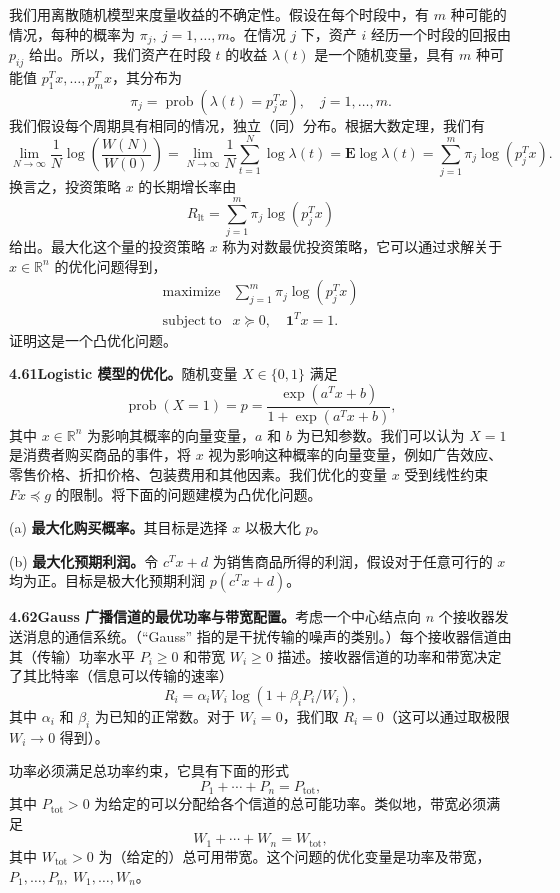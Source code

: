 \documentclass[UTF8,12pt,a4paper,fontset=fandol]{ctexart}
\begin{document}
我们用离散随机模型来度量收益的不确定性。假设在每个时段中，有 $m$ 种可能的情况，每种的概率为 $\pi_j,\ j=1,\ldots,m$。在情况 $j$ 下，资产 $i$ 经历一个时段的回报由 $p_{ij}$ 给出。所以，我们资产在时段 $t$ 的收益 $\lambda(t)$ 是一个随机变量，具有 $m$ 种可能值 $p_1^Tx,\ldots,p_m^Tx$，其分布为
\[
\pi_j=\operatorname{prob}(\lambda(t)=p_j^Tx),\quad j=1,\ldots,m.
\]
我们假设每个周期具有相同的情况，独立（同）分布。根据大数定理，我们有
\[
\lim_{N\to\infty}\frac{1}{N}\log\left(\frac{W(N)}{W(0)}\right)
=\lim_{N\to\infty}\frac{1}{N}\sum_{t=1}^N\log\lambda(t)
=\mathbf{E}\log\lambda(t)=\sum_{j=1}^m\pi_j\log(p_j^Tx).
\]
换言之，投资策略 $x$ 的长期增长率由
\[
R_{\mathrm{lt}}=\sum_{j=1}^m\pi_j\log(p_j^Tx)
\]
给出。最大化这个量的投资策略 $x$ 称为对数最优投资策略，它可以通过求解关于 $x\in\mathbb{R}^n$ 的优化问题得到，
\[
\begin{array}{ll}
\mathop{\mathrm{maximize}} & \displaystyle\sum_{j=1}^m\pi_j\log(p_j^Tx)\\
\mathrm{subject\ to} & x\succeq0,\quad \mathbf{1}^Tx=1.
\end{array}
\]
证明这是一个凸优化问题。

\noindent\textbf{4.61\quad Logistic 模型的优化。}\quad 随机变量 $X\in\{0,1\}$ 满足
\[
\operatorname{prob}(X=1)=p=\frac{\exp(a^Tx+b)}{1+\exp(a^Tx+b)},
\]
其中 $x\in\mathbb{R}^n$ 为影响其概率的向量变量，$a$ 和 $b$ 为已知参数。我们可以认为 $X=1$ 是消费者购买商品的事件，将 $x$ 视为影响这种概率的向量变量，例如广告效应、零售价格、折扣价格、包装费用和其他因素。我们优化的变量 $x$ 受到线性约束 $Fx\preceq g$ 的限制。将下面的问题建模为凸优化问题。

(a) \textbf{最大化购买概率。}\quad 其目标是选择 $x$ 以极大化 $p$。

(b) \textbf{最大化预期利润。}\quad 令 $c^Tx+d$ 为销售商品所得的利润，假设对于任意可行的 $x$ 均为正。目标是极大化预期利润 $p(c^Tx+d)$。

\noindent\textbf{4.62\quad Gauss 广播信道的最优功率与带宽配置。}\quad 考虑一个中心结点向 $n$ 个接收器发送消息的通信系统。（“Gauss” 指的是干扰传输的噪声的类别。）每个接收器信道由其（传输）功率水平 $P_i\geq0$ 和带宽 $W_i\geq0$ 描述。接收器信道的功率和带宽决定了其比特率（信息可以传输的速率）
\[
R_i=\alpha_iW_i\log(1+\beta_iP_i/W_i),
\]
其中 $\alpha_i$ 和 $\beta_i$ 为已知的正常数。对于 $W_i=0$，我们取 $R_i=0$（这可以通过取极限 $W_i\to0$ 得到）。

功率必须满足总功率约束，它具有下面的形式
\[
P_1+\cdots+P_n=P_{\mathrm{tot}},
\]
其中 $P_{\mathrm{tot}}>0$ 为给定的可以分配给各个信道的总可能功率。类似地，带宽必须满足
\[
W_1+\cdots+W_n=W_{\mathrm{tot}},
\]
其中 $W_{\mathrm{tot}}>0$ 为（给定的）总可用带宽。这个问题的优化变量是功率及带宽，$P_1,\ldots,P_n,\ W_1,\ldots,W_n$。
\end{document}
